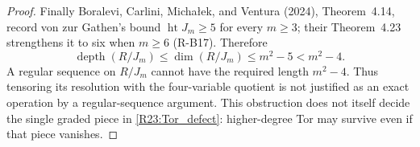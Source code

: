 \begin{proof}
Finally Boralevi, Carlini, Micha{\l}ek, and Ventura (2024),
Theorem~4.14, record von zur Gathen's bound
$\operatorname{ht}J_m\geq5$ for every $m\geq3$; their Theorem~4.23
strengthens it to six when $m\geq6$ (R-B17). Therefore
\[
 \operatorname{depth}(R/J_m)
 \leq\dim(R/J_m)\leq m^2-5<m^2-4.
\]
A regular sequence on $R/J_m$ cannot have the required length
$m^2-4$. Thus tensoring its resolution with the four-variable
quotient is not justified as an exact operation by a regular-sequence
argument. This obstruction does not itself decide the single graded
piece in \eqref{R23:Tor_defect}: higher-degree Tor may survive even
if that piece vanishes.
\end{proof}


